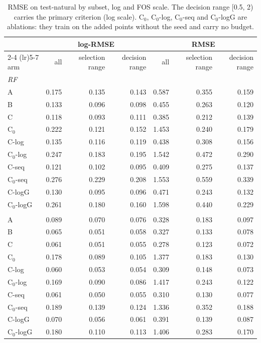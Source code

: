 \begin{table}[htbp]
\centering
\caption{RMSE on test-natural by subset, log and FOS scale. The decision range [0.5, 2) carries the primary criterion (log scale). C$_0$, C$_0$-log, C$_0$-seq and C$_0$-logG are ablations: they train on the added points without the seed and carry no budget.}
\label{tab:test-natural__fos-rmse:subsets}
\begin{tabular}{lrrrrrr}
\toprule
 & \multicolumn{3}{c}{log-RMSE} & \multicolumn{3}{c}{RMSE} \\
\cmidrule(lr){2-4} \cmidrule(lr){5-7}
arm & all & selection range & decision range & all & selection range & decision range \\
\midrule
\multicolumn{7}{l}{\textit{RF}} \\
A & 0.175 & 0.135 & 0.143 & 0.587 & 0.355 & 0.159 \\
B & 0.133 & 0.096 & 0.098 & 0.455 & 0.263 & 0.120 \\
C & 0.118 & 0.093 & 0.111 & 0.385 & 0.212 & 0.139 \\
C$_0$ & 0.222 & 0.121 & 0.152 & 1.453 & 0.240 & 0.179 \\
C-log & 0.135 & 0.116 & 0.119 & 0.438 & 0.308 & 0.156 \\
C$_0$-log & 0.247 & 0.183 & 0.195 & 1.542 & 0.472 & 0.290 \\
C-seq & 0.121 & 0.102 & 0.095 & 0.409 & 0.275 & 0.137 \\
C$_0$-seq & 0.276 & 0.229 & 0.208 & 1.553 & 0.559 & 0.339 \\
C-logG & 0.130 & 0.095 & 0.096 & 0.471 & 0.243 & 0.132 \\
C$_0$-logG & 0.261 & 0.180 & 0.160 & 1.598 & 0.440 & 0.229 \\
\addlinespace
\multicolumn{7}{l}{\textit{GBM}} \\
A & 0.089 & 0.070 & 0.076 & 0.328 & 0.183 & 0.097 \\
B & 0.065 & 0.051 & 0.058 & 0.327 & 0.133 & 0.078 \\
C & 0.061 & 0.051 & 0.055 & 0.278 & 0.123 & 0.072 \\
C$_0$ & 0.178 & 0.089 & 0.105 & 1.377 & 0.183 & 0.130 \\
C-log & 0.060 & 0.053 & 0.054 & 0.309 & 0.148 & 0.073 \\
C$_0$-log & 0.169 & 0.090 & 0.086 & 1.417 & 0.243 & 0.122 \\
C-seq & 0.061 & 0.050 & 0.055 & 0.310 & 0.130 & 0.077 \\
C$_0$-seq & 0.189 & 0.139 & 0.124 & 1.336 & 0.352 & 0.188 \\
C-logG & 0.070 & 0.056 & 0.061 & 0.391 & 0.139 & 0.087 \\
C$_0$-logG & 0.180 & 0.110 & 0.113 & 1.406 & 0.283 & 0.170 \\
\bottomrule
\end{tabular}
\end{table}
